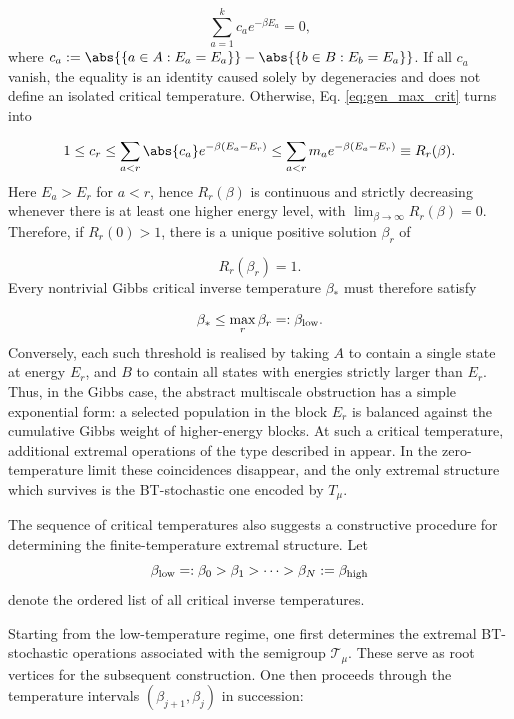 \documentclass[11pt,a4paper,longbibliography]{amsart}
\numberwithin{equation}{section}
\theoremstyle{plain}
\theoremstyle{definition}
\theoremstyle{remark}
\newcommand{\blue}[1]{{\color{blue}#1}}
\begin{document}
		\begin{equation}
			\sum_{a=1}^k c_a e^{-\beta E_a}=0, 
		\end{equation}
		where $
		c_a := \abs{\{a\in A:E_a=E_a\}} - \abs{\{b\in B:E_b=E_a\}}$.
		If all $c_a$ vanish, the equality is an identity caused solely by degeneracies and does not define an isolated critical temperature. Otherwise, Eq. \eqref{eq:gen_max_crit} turns into
		
		\begin{equation}
			1 \leq c_r \leq \sum_{a<r} \abs{c_a}e^{-\beta(E_a-E_r)} \leq \sum_{a<r} m_a e^{-\beta(E_a-E_r)} \equiv R_r(\beta). 
		\end{equation}
		Here $E_a>E_r$ for $a<r$, hence $R_r(\beta)$ is continuous and strictly decreasing whenever there is at least one higher energy level, with $\lim_{\beta\to\infty}R_r(\beta)=0$. Therefore, if $R_r(0)>1$, there is a unique positive solution $\beta_r$ of 
		
		\begin{equation*}
			R_r(\beta_r)=1 . 
		\end{equation*}
		Every nontrivial Gibbs critical inverse temperature $\beta_*$ must therefore satisfy 
		
		\begin{equation}
			\label{eq:minimal_crit_temp} \beta_* \leq \max_r \beta_r =: \beta_{\rm low}. 
		\end{equation}
		Conversely, each such threshold is realised by taking $A$ to contain a single state at energy $E_r$, and $B$ to contain all states with energies strictly larger than $E_r$. Thus, in the Gibbs case, the abstract multiscale obstruction has a simple exponential form: a selected population in the block $E_r$ is balanced against the cumulative Gibbs weight of higher-energy blocks. At such a critical temperature, additional extremal operations of the type described in \cite{mazurek2018decomposability} appear. In the zero-temperature limit these coincidences disappear, and the only extremal structure which survives is the BT-stochastic one encoded by $T_\mu$.
		
			The sequence of critical temperatures also suggests a constructive procedure for determining the finite-temperature extremal structure. Let 
			$$ \beta_{\rm low}=: \beta_0 > \beta_1 > \cdots > \beta_N := \beta_{\rm high} $$ 
			denote the ordered list of all critical inverse temperatures. 
			
			Starting from the low-temperature regime, one first determines the extremal BT-stochastic operations associated with the semigroup $\mathcal{T}_\mu$. These serve as root vertices for the subsequent construction. One then proceeds through the temperature intervals $(\beta_{j+1},\beta_j)$ in succession: 
			
\end{document}
